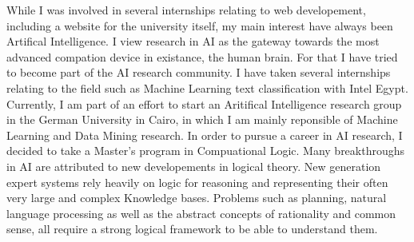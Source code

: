 \documentclass[10pt,stdletter,dateno,sigleft]{newlfm} %
\begin{document}
\begin{newlfm}
  While I was involved in several internships relating to web developement,
  including a website for the university itself, my main interest have always
  been Artifical Intelligence. I view research in AI as the gateway towards the
  most advanced compation device in existance, the human brain. For that I have
  tried to become part of the AI research community. I have taken several
  internships relating to the field such as Machine Learning text classification
  with Intel Egypt. Currently, I am part of an effort to start an Aritifical
  Intelligence research group in the German University in Cairo, in which I am
  mainly reponsible of Machine Learning and Data Mining research. In order to
  pursue a career in AI research, I decided to take a Master's program in
  Compuational Logic. Many breakthroughs in AI are attributed to new
  developements in logical theory. New generation expert systems rely heavily on
  logic for reasoning and representing their often very large and complex
  Knowledge bases. Problems such as planning, natural language processing as
  well as the abstract concepts of rationality and common sense, all require
  a strong logical framework to be able to understand them.
  
  


\end{newlfm}
\end{document}
